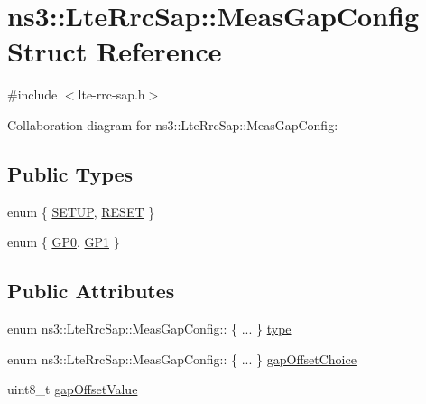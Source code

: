 \hypertarget{structns3_1_1LteRrcSap_1_1MeasGapConfig}{}\section{ns3\+:\+:Lte\+Rrc\+Sap\+:\+:Meas\+Gap\+Config Struct Reference}
\label{structns3_1_1LteRrcSap_1_1MeasGapConfig}


{\ttfamily \#include $<$lte-\/rrc-\/sap.\+h$>$}



Collaboration diagram for ns3\+:\+:Lte\+Rrc\+Sap\+:\+:Meas\+Gap\+Config\+:
\subsection*{Public Types}
\begin{DoxyCompactItemize}
\item 
enum \{ \hyperlink{structns3_1_1LteRrcSap_1_1MeasGapConfig_a704e54a827261e3ea77ed61bc2ec9d87ae426e9b0efc8024b0342d189218a3ad3}{S\+E\+T\+UP}, 
\hyperlink{structns3_1_1LteRrcSap_1_1MeasGapConfig_a704e54a827261e3ea77ed61bc2ec9d87aab6f2aea8bc6dd72ff68288133307efc}{R\+E\+S\+ET}
 \}
\item 
enum \{ \hyperlink{structns3_1_1LteRrcSap_1_1MeasGapConfig_a6e7b5e6cff6ff55fc54c397416804218abbf9ea4bfafedc8047d4f3d0d5dcc061}{G\+P0}, 
\hyperlink{structns3_1_1LteRrcSap_1_1MeasGapConfig_a6e7b5e6cff6ff55fc54c397416804218aa24e9711cfb0bd2bcffca1630d6fe8b2}{G\+P1}
 \}
\end{DoxyCompactItemize}
\subsection*{Public Attributes}
\begin{DoxyCompactItemize}
\item 
enum ns3\+::\+Lte\+Rrc\+Sap\+::\+Meas\+Gap\+Config\+:: \{ ... \}  \hyperlink{structns3_1_1LteRrcSap_1_1MeasGapConfig_af7e706f0e8f0fa3c80410687a5c2cb67}{type}
\item 
enum ns3\+::\+Lte\+Rrc\+Sap\+::\+Meas\+Gap\+Config\+:: \{ ... \}  \hyperlink{structns3_1_1LteRrcSap_1_1MeasGapConfig_a8881a3dab866d938ad0913cb3fbb3913}{gap\+Offset\+Choice}
\item 
uint8\+\_\+t \hyperlink{structns3_1_1LteRrcSap_1_1MeasGapConfig_abdda474a7affed45137bb7b407520c15}{gap\+Offset\+Value}
\end{DoxyCompactItemize}


